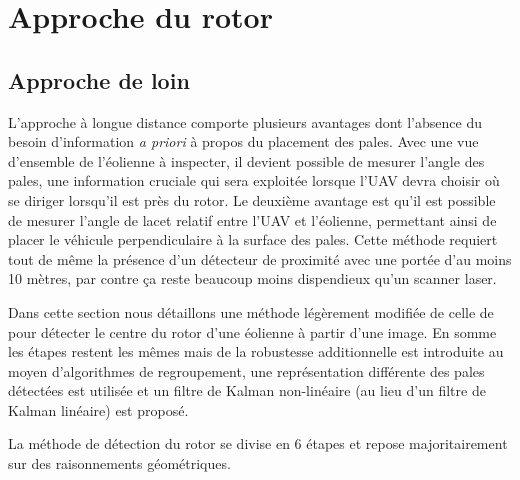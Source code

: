 \section{Approche du rotor}

\subsection{Approche de loin}
\label{subsec:approche_loin}

L'approche à longue distance comporte plusieurs avantages dont l'absence du besoin d'information \textit{a priori} à propos du placement des pales. Avec une vue d'ensemble de l'éolienne à inspecter, il devient possible de mesurer l'angle des pales, une information cruciale qui sera exploitée lorsque l'UAV devra choisir où se diriger lorsqu'il est près du rotor. Le deuxième avantage est qu'il est possible de mesurer l'angle de lacet relatif entre l'UAV et l'éolienne, permettant ainsi de placer le véhicule perpendiculaire à la surface des pales. Cette méthode requiert tout de même la présence d'un détecteur de proximité avec une portée d'au moins 10 mètres, par contre ça reste beaucoup moins dispendieux qu'un scanner laser.

Dans cette section nous détaillons une méthode légèrement modifiée de celle de \citep{Stokkeland2015} pour détecter le centre du rotor d'une éolienne à partir d'une image. En somme les étapes restent les mêmes mais de la robustesse additionnelle est introduite au moyen d'algorithmes de regroupement, une représentation différente des pales détectées est utilisée et un filtre de Kalman non-linéaire (au lieu d'un filtre de Kalman linéaire) est proposé.

La méthode de détection du rotor se divise en 6 étapes et repose majoritairement sur des raisonnements géométriques.

